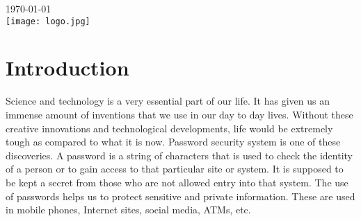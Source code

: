\documentclass{article}
\begin{document}
\begin{titlepage}


{\large \today}\\[1cm] %


\texttt{[image: logo.jpg]}\\[1cm] %
 

\vfill %

\end{titlepage}


\tableofcontents
\newpage
\section{Introduction}
Science and technology is a very essential part of our life. It has given us an immense amount of inventions that we use in our day to day lives. Without these creative innovations and technological developments, life would be extremely tough as compared to what it is now. Password security system is one of these discoveries. A password is a string of characters that is used to check the identity of a person or to gain access to that particular site or system. It is supposed to be kept a secret from those who are not allowed entry into that system.
The use of passwords helps us to protect sensitive and private information. These are used in mobile phones, Internet sites, social media, ATMs, etc.
\end{document}
